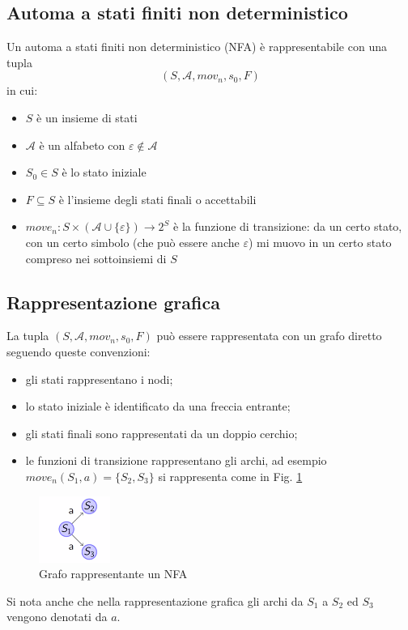 \documentclass[class=book, crop=false, oneside, 12pt]{standalone}
\begin{document}
\subsection{Automa a stati finiti non deterministico}
Un automa a stati finiti non deterministico (NFA) è rappresentabile con una tupla
\begin{equation*}
    (S, \mathcal{A}, mov_n, s_0, F)
    \label{nfa_tupla}
\end{equation*}
in cui:
\begin{itemize}
    \item \(S\) è un insieme di stati
    \item \(\mathcal{A}\) è un alfabeto con \(\varepsilon \notin \mathcal{A}\)
    \item \(S_0 \in S\) è lo stato iniziale
    \item \(F \subseteq S\) è l’insieme degli stati finali o accettabili 
    \item \(move_n : S \times (\mathcal{A} \cup \{\varepsilon\}) \to 2^S\) è la funzione di transizione: da un certo stato, con un certo simbolo (che può essere anche \(\varepsilon\)) mi muovo in un certo stato compreso nei sottoinsiemi di \(S\)
\end{itemize}

\subsection{Rappresentazione grafica}
La tupla \((S, \mathcal{A}, mov_n, s_0, F)\) può essere rappresentata con un grafo diretto seguendo queste convenzioni:
\begin{itemize}
    \item gli stati rappresentano i nodi;
    \item lo stato iniziale è identificato da una freccia entrante;
    \item gli stati finali sono rappresentati da un doppio cerchio;
    \item le funzioni di transizione rappresentano gli archi, ad esempio \(move_n(S_1, a) = \{S_2, S_3\}\) si rappresenta come in Fig. \ref{nfa_grafo_esempio}
\end{itemize}

\begin{figure}
    \centering
    \includegraphics[width=.2\textwidth,keepaspectratio]{nfa_grafo_esempio}
    \caption{Grafo rappresentante un NFA}
    \label{nfa_grafo_esempio}
\end{figure}
Si nota anche che nella rappresentazione grafica gli archi da $S_1$ a $S_2$ ed $S_3$ vengono denotati da $a$.
\end{document}
